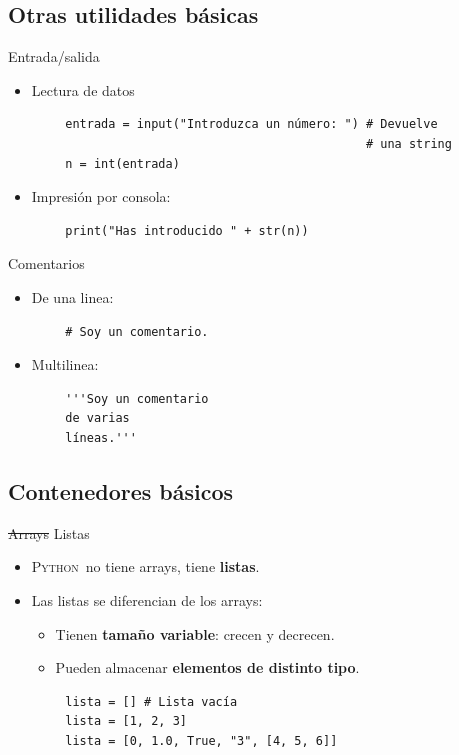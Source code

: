 \documentclass[10pt]{beamer} %
\newcommand{\py}{\textsc{Python}}
\begin{document}
\subsection{Otras utilidades básicas}
\begin{frame}[fragile]{Entrada/salida}
    \begin{itemize}
        \item Lectura de datos
    \end{itemize}
    \begin{verbatim}
        entrada = input("Introduzca un número: ") # Devuelve
                                                  # una string
        n = int(entrada)
    \end{verbatim}
    \begin{itemize}
        \item Impresión por consola:
    \end{itemize}
    \begin{verbatim}
        print("Has introducido " + str(n))
    \end{verbatim}
\end{frame}

\begin{frame}[fragile]{Comentarios}
    \begin{itemize}
        \item De una linea:
    \end{itemize}
    \begin{verbatim}
        # Soy un comentario.
    \end{verbatim}
    \begin{itemize}
        \item Multilinea:
    \end{itemize}
    \begin{verbatim}
        '''Soy un comentario
        de varias
        líneas.'''
    \end{verbatim}
\end{frame}

\subsection{Contenedores básicos}
\begin{frame}[fragile]{\sout{ Arrays } Listas}
    \begin{itemize}
        \item \py\, no tiene arrays, tiene \textbf{listas}.
        \item Las listas se diferencian de los arrays:
        \begin{itemize}
            \item Tienen \textbf{tamaño variable}: crecen y decrecen.
            \item Pueden almacenar \textbf{elementos de distinto tipo}.
        \end{itemize}
    \end{itemize}
    \begin{verbatim}
        lista = [] # Lista vacía
        lista = [1, 2, 3]
        lista = [0, 1.0, True, "3", [4, 5, 6]]
    \end{verbatim}
\end{frame}
\end{document}

